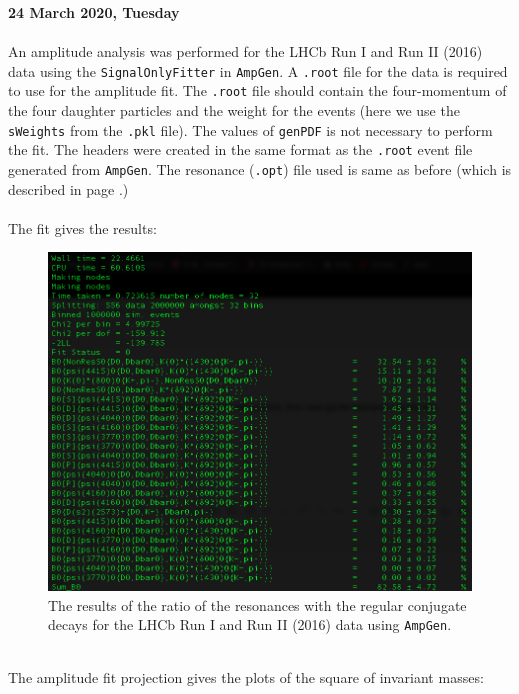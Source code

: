 \clearpage
\noindent\textbf{24 March 2020, Tuesday}
\\
\\
An amplitude analysis was performed for the LHCb Run I and Run II (2016) data using the \texttt{SignalOnlyFitter} in \texttt{AmpGen}. A \texttt{.root} file for the data is required to use for the amplitude fit. The \texttt{.root} file should contain the four-momentum of the four daughter particles and the weight for the events (here we use the \texttt{sWeights} from the \texttt{.pkl} file). The values of \texttt{genPDF} is not necessary to perform the fit. The headers were created in the same format as the \texttt{.root} event file generated from \texttt{AmpGen}. The resonance (\texttt{.opt}) file used is same as before (which is described in page \pageref{aa_test}.)
\\
\\
The fit gives the results:
\begin{figure}[h]
\center
\includegraphics*[width=0.96\linewidth]{amplitude_fit/resonance_ratio}
\caption{The results of the ratio of the resonances with the regular conjugate decays for the LHCb Run I and Run II (2016) data using \texttt{AmpGen}.}
\label{resonance_ratio}
\end{figure}
\\
The amplitude fit projection gives the plots of the square of invariant masses:
